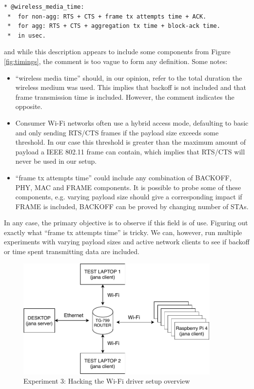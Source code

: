 \begin{verbatim}
* @wireless_media_time:
 *  for non-agg: RTS + CTS + frame tx attempts time + ACK.
 *  for agg: RTS + CTS + aggregation tx time + block-ack time.
 *  in usec.
\end{verbatim}

and while this description appears to include some components from Figure
\ref{fig:timings}, the comment is too vague to form any definition. Some
notes:

\begin{itemize}

\item ``wireless media time'' should, in our opinion, refer to the total
duration the wireless medium was used. This implies that backoff is not
included and that frame transmission time is included. However, the comment
indicates the opposite.

\item Consumer Wi-Fi networks often use a hybrid access mode, defaulting to
basic and only sending RTS/CTS frames if the payload size exceeds some
threshold. In our case this threshold is greater than the maximum amount of
payload a IEEE 802.11 frame can contain, which implies that RTS/CTS will never
be used in our setup.

\item ``frame tx attempts time'' could include any combination of BACKOFF, PHY,
MAC and FRAME components. It is possible to probe some of these components,
e.g. varying payload size should give a corresponding impact if FRAME is
included, BACKOFF can be proved by changing number of STAs.

\end{itemize}

In any case, the primary objective is to observe if this field is of use.
Figuring out exactly what ``frame tx attempts time'' is tricky. We can,
however, run multiple experiments with varying payload sizes and active
network clients to see if backoff or time spent transmitting data are
included.


\begin{figure}
\center
\includegraphics[width=0.9\textwidth]{images/exp3-overview.pdf}
\caption{Experiment 3: Hacking the Wi-Fi driver setup overview}
\label{fig:exp3_overview}
\end{figure}


